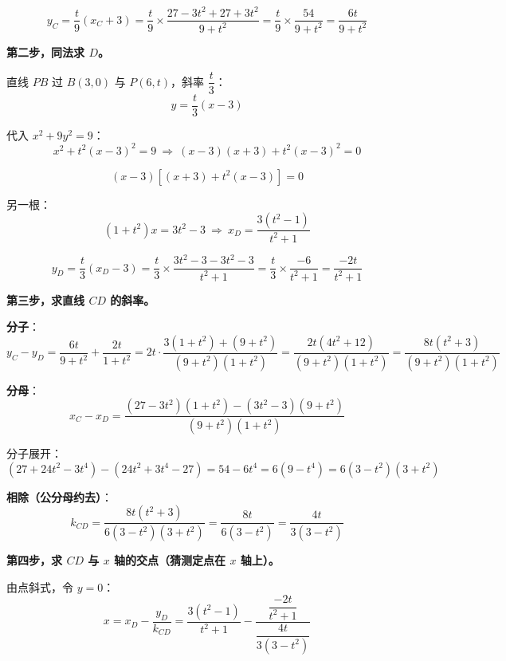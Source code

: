 \begin{answer}
\nopagebreak[4]
\[y_C=\frac t9\left(x_C+3\right)=\frac t9\times\frac{27-3t^{2}+27+3t^{2}}{9+t^{2}}=\frac t9\times\frac{54}{9+t^{2}}=\frac{6t}{9+t^{2}}\]

\textbf{第二步，同法求 $D$。}

直线 $PB$ 过 $B(3,0)$ 与 $P(6,t)$，斜率 $\dfrac t3$：
\nopagebreak[4]
\[y=\frac t3(x-3)\]

代入 $x^{2}+9y^{2}=9$：
\nopagebreak[4]
\[x^{2}+t^{2}(x-3)^{2}=9\ \Longrightarrow\ (x-3)(x+3)+t^{2}(x-3)^{2}=0\]

\nopagebreak[4]
\[(x-3)\left[(x+3)+t^{2}(x-3)\right]=0\]

另一根：
\nopagebreak[4]
\[\left(1+t^{2}\right)x=3t^{2}-3\ \Longrightarrow\ x_D=\frac{3\left(t^{2}-1\right)}{t^{2}+1}\]

\nopagebreak[4]
\[y_D=\frac t3\left(x_D-3\right)=\frac t3\times\frac{3t^{2}-3-3t^{2}-3}{t^{2}+1}=\frac t3\times\frac{-6}{t^{2}+1}=\frac{-2t}{t^{2}+1}\]

\textbf{第三步，求直线 $CD$ 的斜率。}

\textbf{分子}：
\nopagebreak[4]
\[y_C-y_D=\frac{6t}{9+t^{2}}+\frac{2t}{1+t^{2}}=2t\cdot\frac{3\left(1+t^{2}\right)+\left(9+t^{2}\right)}{\left(9+t^{2}\right)\left(1+t^{2}\right)}=\frac{2t\left(4t^{2}+12\right)}{\left(9+t^{2}\right)\left(1+t^{2}\right)}=\frac{8t\left(t^{2}+3\right)}{\left(9+t^{2}\right)\left(1+t^{2}\right)}\]

\textbf{分母}：
\nopagebreak[4]
\[x_C-x_D=\frac{\left(27-3t^{2}\right)\left(1+t^{2}\right)-\left(3t^{2}-3\right)\left(9+t^{2}\right)}{\left(9+t^{2}\right)\left(1+t^{2}\right)}\]

分子展开：
\nopagebreak[4]
\[\left(27+24t^{2}-3t^{4}\right)-\left(24t^{2}+3t^{4}-27\right)=54-6t^{4}=6\left(9-t^{4}\right)=6\left(3-t^{2}\right)\left(3+t^{2}\right)\]

\textbf{相除（公分母约去）}：
\nopagebreak[4]
\[k_{CD}=\frac{8t\left(t^{2}+3\right)}{6\left(3-t^{2}\right)\left(3+t^{2}\right)}=\frac{8t}{6\left(3-t^{2}\right)}=\frac{4t}{3\left(3-t^{2}\right)}\]

\textbf{第四步，求 $CD$ 与 $x$ 轴的交点（猜测定点在 $x$ 轴上）。}

由点斜式，令 $y=0$：
\nopagebreak[4]
\[x=x_D-\frac{y_D}{k_{CD}}=\frac{3\left(t^{2}-1\right)}{t^{2}+1}-\frac{\dfrac{-2t}{t^{2}+1}}{\dfrac{4t}{3\left(3-t^{2}\right)}}\]


\end{answer}
